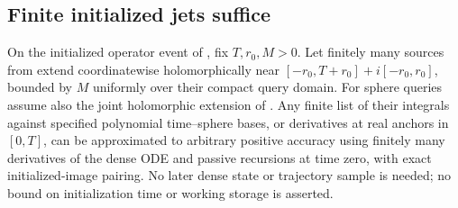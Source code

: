 \subsection{Finite initialized jets suffice}

\begin{proposition}
\label{cp:jets}
On the initialized operator event of , fix $T,r_0,M>0$.
Let finitely many sources from  extend coordinatewise
holomorphically near $[-r_0,T+r_0]+i[-r_0,r_0]$, bounded by $M$ uniformly
over their compact query domain. For sphere queries assume also the joint
holomorphic extension of .
Any finite list of their integrals against specified polynomial time--sphere
bases, or derivatives at real anchors in $[0,T]$, can be approximated to
arbitrary positive accuracy using finitely many derivatives of the dense ODE
and passive recursions at time zero, with exact initialized-image pairing.
No later dense state or trajectory sample is needed; no bound on
initialization time or working storage is asserted.
\end{proposition}
